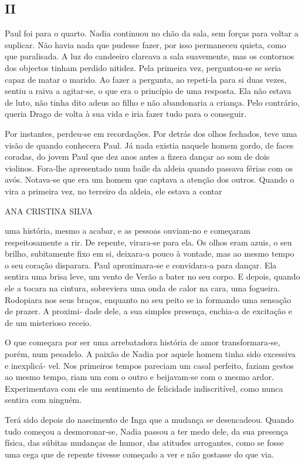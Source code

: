 \subsection{II}\label{ii}


Paul foi para o quarto. Nadia continuou no chão da sala, sem forças para
voltar a suplicar. Não havia nada que pudesse fazer, por isso permaneceu
quieta, como que paralisada. A luz do candeeiro clareava a sala
suavemente, mas os contornos dos objectos tinham perdido nitidez. Pela
primeira vez, perguntou‑se se seria capaz de matar o marido. Ao fazer a
pergunta, ao repeti‑la para si duas vezes, sentiu a raiva a agitar‑se, o
que era o princípio de uma resposta. Ela não estava de luto, não tinha
dito adeus ao filho e não abandonaria a criança. Pelo contrário, queria
Drago de volta à sua vida e iria fazer tudo para o conseguir.

Por instantes, perdeu‑se em recordações. Por detrás dos olhos fechados,
teve uma visão de quando conhecera Paul. Já nada existia naquele homem
gordo, de faces coradas, do jovem Paul que dez anos antes a fizera
dançar ao som de dois violinos. Fora‑lhe apresentado num baile da aldeia
quando passava férias com os avós. Notava‑se que era um homem que
captava a atenção dos outros. Quando o vira a primeira vez, no terreiro
da aldeia, ele estava a contar

ANA CRISTINA SILVA

uma história, mesmo a acabar, e as pessoas ouviam‑no e começaram
respeitosamente a rir. De repente, virara‑se para ela. Os olhos eram
azuis, o seu brilho, subitamente fixo em si, deixara‑a pouco à vontade,
mas ao mesmo tempo o seu coração disparara. Paul aproximara‑se e
convidara‑a para dançar. Ela sentira uma brisa leve, um vento de Verão a
bater no seu corpo. E depois, quando ele a tocara na cintura, sobreviera
uma onda de calor na cara, uma fogueira. Rodopiara nos seus braços,
enquanto no seu peito se ia formando uma sensação de prazer. A proximi‑
dade dele, a sua simples presença, enchia‑a de excitação e de um
misterioso receio.

O que começara por ser uma arrebatadora história de amor
transformara‑se, porém, num pesadelo. A paixão de Nadia por aquele homem
tinha sido excessiva e inexplicá‑ vel. Nos primeiros tempos pareciam um
casal perfeito, faziam gestos ao mesmo tempo, riam um com o outro e
beijavam‑se com o mesmo ardor. Experimentava com ele um sentimento de
felicidade indiscritível, como nunca sentira com ninguém.

Terá sido depois do nascimento de Inga que a mudança se desencadeou.
Quando tudo começou a desmoronar‑se, Nadia passou a ter medo dele, da
sua presença física, das súbitas mudanças de humor, das atitudes
arrogantes, como se fosse uma cega que de repente tivesse começado a ver
e não gostasse do que via.

